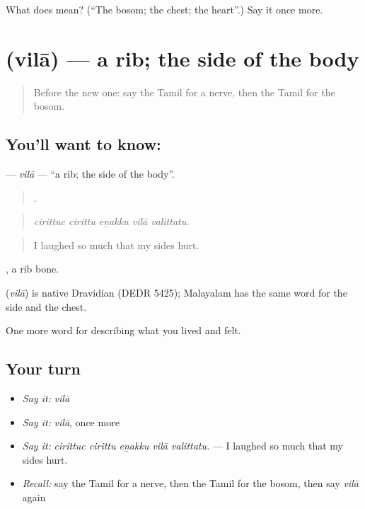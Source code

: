 \begin{tcolorbox}[breakable,colback=teal!4,colframe=teal!35!black,title={Before you move on}]
What does  mean? (\textquotedblleft{}The bosom; the chest; the heart\textquotedblright{}.) Say it once more.
\end{tcolorbox}
\section[\texorpdfstring{\ta{விலா} (vilā)}{விலா (vilā)}]{ (vilā) — a rib; the side of the body}

\label{lesson:TA-C479-vila}



\begin{quote}
Before the new one: say the Tamil for a nerve, then the Tamil for the bosom.
\end{quote}

\subsection*{You'll want to know: }
\textbf{} — \emph{vilā} — \textquotedblleft{}a rib; the side of the body\textquotedblright{}.

\begin{quote}
    .
\end{quote}

\begin{quote}
\emph{cirittuc cirittu eṉakku vilā valittatu.}
\end{quote}

\begin{quote}
I laughed so much that my sides hurt.
\end{quote}

 , a rib bone.

\begin{cousinweb}
\textbf{} (\emph{vilā}) is native Dravidian (DEDR 5425); Malayalam has the same word for the side and the chest.
\end{cousinweb}

\begin{grammarlens}[title={What you've built}]
One more word for describing what you lived and felt.
\end{grammarlens}

\subsection*{Your turn}
\begin{itemize}
\raggedright
  \item \emph{Say it:} \emph{vilā}
  \item \emph{Say it:} \emph{vilā}, once more
  \item \emph{Say it:} \emph{cirittuc cirittu eṉakku vilā valittatu.} — I laughed so much that my sides hurt.
  \item \emph{Recall:} say the Tamil for a nerve, then the Tamil for the bosom, then say \emph{vilā} again
\end{itemize}

